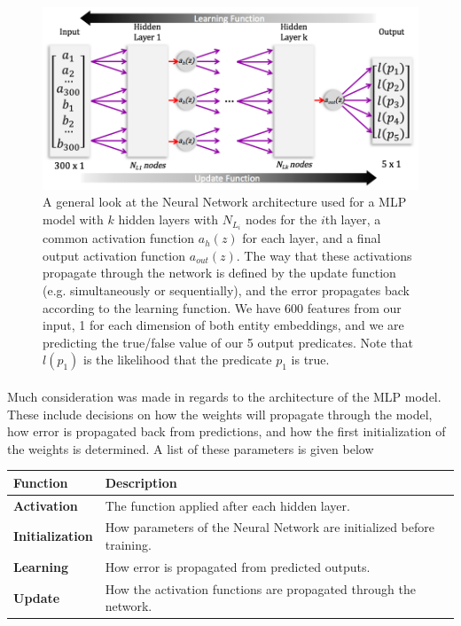 \documentclass[11.5pt]{article}
\newcounter{graphics}
\begin{document}
\begin{figure}[h!]
 \includegraphics[width=1\textwidth]{report_mlp/GenArchitecture.png}
  \caption{\small A general look at the Neural Network architecture used for a MLP model with $k$ hidden layers with $N_{L_i}$ nodes for the $i$th layer, a common activation function $a_h(z)$ for each layer, and a final output activation function $a_{out}(z)$. The way that these activations propagate through the network is defined by the update function (e.g. simultaneously or sequentially), and the error propagates back according to the learning function. We have 600 features from our input, 1 for each dimension of both entity embeddings, and we are predicting the true/false value of our 5 output predicates. Note that $l(p_1)$ is the likelihood that the predicate $p_1$ is true.  }
  \label{MLPArch}
\end{figure}


\paragraph{}
Much consideration was made in regards to the architecture of the MLP model. These include decisions on how the weights will propagate through the model, how error is propagated back from predictions, and how the first initialization of the weights is determined. A list of these parameters is given below
\begin{center}
\begin{tabular}{|ll|}
\hline
\textbf{Function  }& \textbf{Description } \\%
\hline
\textbf{Activation} & The function applied after each hidden layer. \\%
\textbf{Initialization} & How parameters of the Neural Network are initialized before training. \\%
\textbf{Learning} & How error is propagated from predicted outputs. \\%
\textbf{Update} & How the activation functions are propagated through the network. \\%
\hline
\end{tabular}
\end{center}
\end{document}
